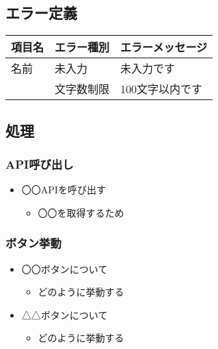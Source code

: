 \documentclass[letterpaper,10pt,dvipdfmx]{sphinxmanual}
\begin{document}
\subsection{エラー定義}
\label{\detokenize{page_001:id3}}

\begin{savenotes}\sphinxattablestart
\centering
\begin{tabulary}{\linewidth}[t]{|T|T|T|}
\hline
\sphinxstyletheadfamily 
項目名
&\sphinxstyletheadfamily 
エラー種別
&\sphinxstyletheadfamily 
エラーメッセージ
\\
\hline
名前
&
未入力
&
未入力です
\\
\hline&
文字数制限
&
100文字以内です
\\
\hline
\end{tabulary}
\par
\sphinxattableend\end{savenotes}


\subsection{処理}
\label{\detokenize{page_001:id4}}

\subsubsection{API呼び出し}
\label{\detokenize{page_001:api}}\begin{itemize}
\item {} 
〇〇APIを呼び出す
\begin{itemize}
\item {} 
〇〇を取得するため

\end{itemize}

\end{itemize}


\subsubsection{ボタン挙動}
\label{\detokenize{page_001:id5}}\begin{itemize}
\item {} 
〇〇ボタンについて
\begin{itemize}
\item {} 
どのように挙動する

\end{itemize}

\item {} 
△△ボタンについて
\begin{itemize}
\item {} 
どのように挙動する

\end{itemize}

\end{itemize}
\end{document}
